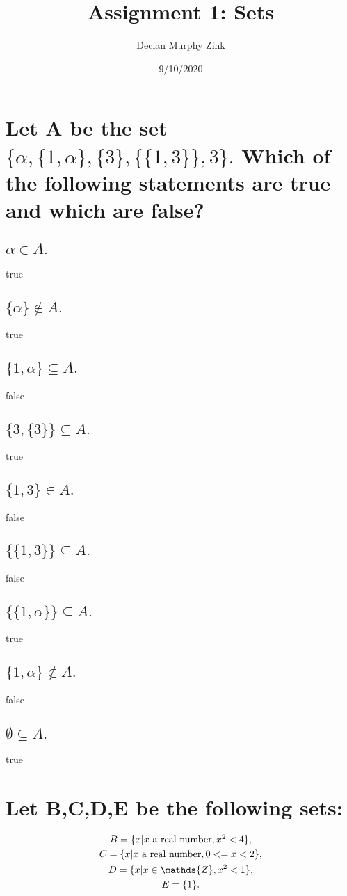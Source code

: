 \documentclass[12pt]{article}
\begin{document}
\title{Assignment 1: Sets}
\author{Declan Murphy Zink}
\date{9/10/2020}

\maketitle

\section{
    Let A be the set $\{\alpha,\{1,\alpha\},\{3\},\{\{1,3\}\},3\}.$ 
    Which of the following statements are true and which are false?
}
\subsection{$\alpha \in A.$}
true
\subsection{$\{\alpha\} \notin A.$}
true
\subsection{$\{1,\alpha\} \subseteq A.$}
false
\subsection{$\{3,\{3\}\} \subseteq A.$}
true
\subsection{$\{1,3\} \in A.$}
false
\subsection{$\{\{1,3\}\} \subseteq A.$}
false
\subsection{$\{\{1,\alpha\}\} \subseteq A.$}
true
\subsection{$\{1,\alpha\} \notin A.$}
false
\subsection{$\emptyset \subseteq A.$}
true

\section{
    Let B,C,D,E be the following sets:
}
\begin{gather*}
    B = \{x|x$ a real number$,x^2 < 4\},\\
    C = \{x|x$ a real number$, 0 <= x < 2\},\\
    D = \{x|x \in \mathds{Z} ,x^2 < 1\},\\
    E = \{1\}.
\end{gather*}
\end{document}

